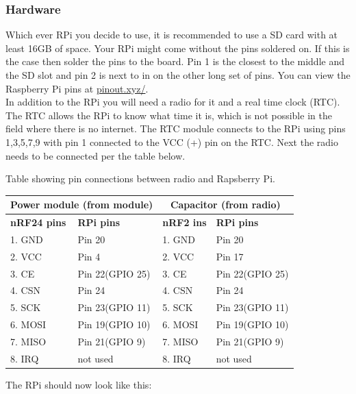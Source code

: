 \documentclass[12pt]{article}
\begin{document}
\subsubsection{Hardware}
Which ever RPi you decide to use, it is recommended to use a SD card with at least 16GB of space.  Your RPi might come without the pins soldered on.  If this is the case then solder the pins to the board.  Pin 1 is the closest to the middle and the SD slot and pin 2 is next to in on the other long set of pins.  You can view the Raspberry Pi pins at \href{https://pinout.xyz/}{pinout.xyz/}.\\
In addition to the RPi you will need a radio for it and a real time clock (RTC).  The RTC allows the RPi to know what time it is, which is not possible in the field where there is no internet.  The RTC module connects to the RPi using pins 1,3,5,7,9 with pin 1 connected to the VCC (+) pin on the RTC.  Next the radio needs to be connected per the table below.
\begin{center}
	Table showing pin connections between radio and Rapsberry Pi.
	\begin{tabularx}{\textwidth}{ |X|X||X|X| }
		\hline
		\multicolumn{2}{|c||}{\textbf{Power module (from module)}} & \multicolumn{2}{|c|}{\textbf{Capacitor (from radio)}}\\
		\hline
		\textbf{nRF24 pins} & \textbf{RPi pins} & \textbf{nRF2 ins} & \textbf{RPi pins}\\ 
		\hline
		1. GND & Pin 20 & 1. GND & Pin 20 \\ 
		\hline
		2. VCC & Pin 4 & 2. VCC & Pin 17 \\ 
		\hline
		3. CE & Pin 22(GPIO 25) & 3. CE & Pin 22(GPIO 25) \\ 
		\hline
		4. CSN & Pin 24 & 4. CSN & Pin 24 \\ 
		\hline
		5. SCK & Pin 23(GPIO 11) & 5. SCK & Pin 23(GPIO 11) \\ 
		\hline
		6. MOSI & Pin 19(GPIO 10) & 6. MOSI & Pin 19(GPIO 10) \\ 
		\hline
		7. MISO & Pin 21(GPIO 9) & 7. MISO & Pin 21(GPIO 9) \\ 
		\hline
		8. IRQ & not used & 8. IRQ & not used \\ 
		\hline
	\end{tabularx}
\end{center}
The RPi should now look like this:
\end{document}
